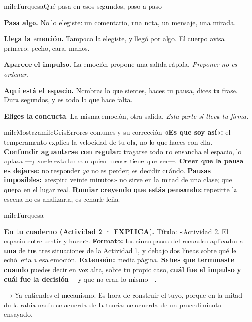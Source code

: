 \documentclass[11pt,letterpaper]{article}
\newcommand{\puente}[1]{%
  \begin{puentebox}%
    \textcolor{milcGradeDark}{$\rightarrow$}\hspace{2mm}#1%
  \end{puentebox}%
}
\begin{document}
\begin{drawbox}{milcTurquesa}{Qué pasa en esos segundos, paso a paso}
\begin{pasoslista}
\item \textbf{Pasa algo.} No lo elegiste: un comentario, una nota, un mensaje, una mirada.
\item \textbf{Llega la emoción.} Tampoco la elegiste, y llegó por algo. El cuerpo avisa primero: pecho, cara, manos.
\item \textbf{Aparece el impulso.} La emoción propone una salida rápida. \emph{Proponer no es ordenar.}
\item \textbf{Aquí está el espacio.} Nombras lo que sientes, haces tu pausa, dices tu frase. Dura segundos, y es todo lo que hace falta.
\item \textbf{Eliges la conducta.} La misma emoción, otra salida. \emph{Esta parte sí lleva tu firma.}
\end{pasoslista}
\end{drawbox}

\begin{softbox}{milcMostaza}{milcGris}{Errores comunes y su corrección}
\textbf{«Es que soy así»:} el temperamento explica la velocidad de tu ola, no lo que haces con ella. \textbf{Confundir aguantarse con regular:} tragarse todo no ensancha el espacio, lo aplaza ---y suele estallar con quien menos tiene que ver---. \textbf{Creer que la pausa es dejarse:} no responder \emph{ya} no es perder; es decidir cuándo. \textbf{Pausas imposibles:} «respiro veinte minutos» no sirve en la mitad de una clase; que quepa en el lugar real. \textbf{Rumiar creyendo que estás pensando:} repetirte la escena no es analizarla, es echarle leña.
\end{softbox}

\begin{infoband}{milcTurquesa}


\textbf{En tu cuaderno (Actividad 2 · EXPLICA).} Título: «Actividad 2. El espacio entre sentir y hacer». \textbf{Formato:} los cinco pasos del recuadro aplicados a \textbf{una} de tus tres situaciones de la Actividad 1, y debajo dos líneas sobre qué le echó leña a esa emoción. \textbf{Extensión:} media página. \textbf{Sabes que terminaste cuando} puedes decir en voz alta, sobre tu propio caso, \textbf{cuál fue el impulso y cuál fue la decisión} ---y que no eran lo mismo---.
\end{infoband}

\puente{Ya entiendes el mecanismo. Es hora de construir el tuyo, porque en la mitad de la rabia nadie se acuerda de la teoría: se acuerda de un procedimiento ensayado.}
\end{document}
